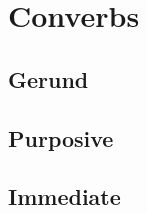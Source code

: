 \section{Converbs}
\subsection{Gerund} \label{sec:gerund}
\subsection{Purposive} \label{sec:purposive.converb}
\subsection{Immediate} \label{sec:immediate.converb}

